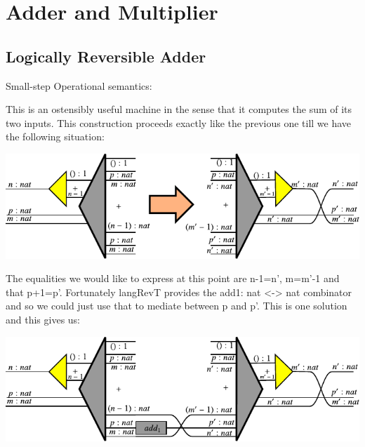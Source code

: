 \documentclass{llncs}
\begin{document}
\section{Adder and Multiplier}

\subsection{Logically Reversible Adder}

%

Small-step Operational semantics:


This is an ostensibly useful machine in the sense that it computes the
sum of its two inputs.  This construction proceeds exactly like the
previous one till we have the following situation:

\begin{center}
  \includegraphics{diagrams/adder1.pdf}
\end{center}

The equalities we would like to express at this point are {{n-1=n'}},
{{m=m'-1}} and that {{p+1=p'}}. Fortunately {{langRevT}} provides the
{{add1: nat <-> nat}} combinator and so we could just use that to
mediate between {{p}} and {{p'}}. This is one solution and this gives
us:

\begin{center}
  \includegraphics{diagrams/adder2.pdf}
\end{center}
\end{document}
